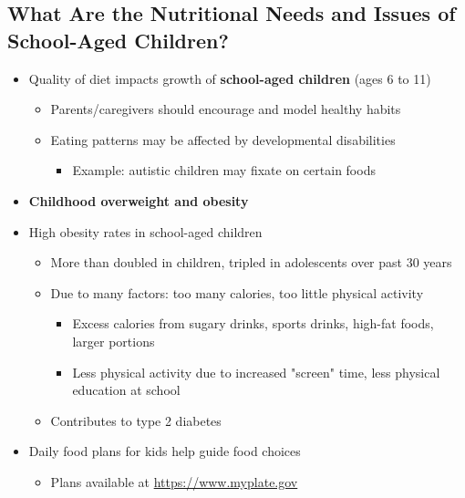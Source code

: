 \documentclass[12pt]{article}
\begin{document}
        \subsection{What Are the Nutritional Needs and Issues of School-Aged Children?}
            \begin{itemize}
                \item Quality of diet impacts growth of \textbf{school-aged children} (ages 6 to 11)
                    \begin{itemize}
                        \item Parents/caregivers should encourage and model healthy habits
                        \item Eating patterns may be affected by developmental disabilities
                            \begin{itemize}
                                \item Example: autistic children may fixate on certain foods
                            \end{itemize}
                    \end{itemize}
                \item \textbf{Childhood overweight and obesity}
                \item High obesity rates in school-aged children
                    \begin{itemize}
                        \item More than doubled in children, tripled in adolescents over past 30 years
                        \item Due to many factors: too many calories, too little physical activity
                            \begin{itemize}
                                \item Excess calories from sugary drinks, sports drinks, high-fat foods, larger portions
                                \item Less physical activity due to increased "screen" time, less physical education at school
                            \end{itemize}
                        \item Contributes to type 2 diabetes
                    \end{itemize}
                \item Daily food plans for kids help guide food choices
                    \begin{itemize}
                        \item Plans available at \href{https://www.myplate.gov}{https://www.myplate.gov}

\end{itemize}
\end{itemize}
\end{document}

